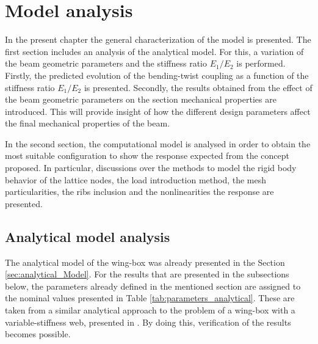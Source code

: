 \chapter{Model analysis} \label{chap:Results_model}
%
  
  In the present chapter the general characterization of the model is presented. The first section includes an analysis of the analytical model. For this, a variation of the beam geometric parameters and the stiffness ratio $E_1/E_2$ is performed. Firstly, the predicted evolution of the bending-twist coupling as a function of the stiffness ratio $E_1/E_2$ is presented. Secondly, the results obtained from the effect of the beam geometric parameters on the section mechanical properties are introduced. This will provide insight of how the different design parameters affect the final mechanical properties of the beam.

  In the second section, the computational model is analysed in order to obtain the most suitable configuration to show the response expected from the concept proposed. In particular, discussions over the methods to model the rigid body behavior of the lattice nodes, the load introduction method, the mesh particularities, the ribs inclusion and the nonlinearities the response are presented. 

\section{Analytical model analysis} \label{sec:analyticalParametricStudy_results_model}

  The analytical model of the wing-box was already presented in the Section \ref{sec:analytical_Model}. For the results that are presented in the subsections below, the parameters already defined in the mentioned section are assigned to the nominal values presented in Table \ref{tab:parameters_analytical}. These are taken from a similar analytical approach to the problem of a wing-box with a variable-stiffness web, presented in \cite{Raither2013a}. By doing this, verification of the results becomes possible.

